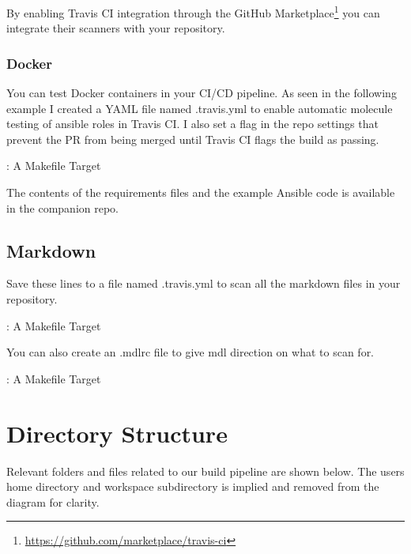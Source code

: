\justify
By enabling Travis CI integration through the GitHub
Marketplace\footnote{\url{https://github.com/marketplace/travis-ci}} you
can integrate their scanners with your repository.

\subsubsection{Docker}

\justify
You can test Docker containers in your CI/CD pipeline. As seen in the
following example I created a YAML file named .travis.yml to enable
automatic molecule testing of ansible roles in Travis CI. I also set a
flag in the repo settings that prevent the PR from being merged until
Travis CI flags the build as passing.

\justify
\begin{mybox}{\thetcbcounter: A Makefile Target}
	
\end{mybox}

The contents of the requirements files and the example Ansible code is
available in the companion repo.


\subsection{Markdown}

Save these lines to a file named .travis.yml to scan all the markdown files in your repository.

\justify
\begin{mybox}{\thetcbcounter: A Makefile Target}
	
\end{mybox}

\justify
You can also create an .mdlrc file to give mdl direction on what to scan for.

\justify
\begin{mybox}{\thetcbcounter: A Makefile Target}
	
\end{mybox}

\clearpage

\section{Directory Structure}

\justify
Relevant folders and files related to our build pipeline are shown below. The users home directory and workspace subdirectory is implied and removed from the diagram for clarity.



